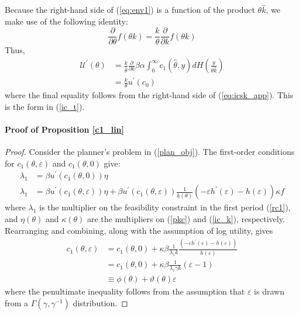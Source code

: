 \documentclass[11pt]{article}
\newcommand{\p}{\prime}
\newcommand{\inv}[1]{#1^{-1}}
\newcommand{\U}{\mathcal{U}}
\begin{document}
Because the right-hand side of (\ref{eq:env1}) is a function of the product \( \theta\hat{k} \), we make use of the following identity:
\begin{equation*}
    \frac{\partial}{\partial \theta}f(\theta k) = \frac{k}{\theta} \frac{\partial}{\partial k}f(\theta k)
\end{equation*}
Thus,
\begin{align*}
    \U^\p(\theta) &= \frac{k}{\hat{\theta}} \frac{\partial}{\partial k} \beta\alpha\int_{0}^{\infty}c_1(\hat{\theta},y)dH\left( \frac{y}{\theta \hat{k}} \right) \\
    &= \frac{k}{\theta}u^\p(c_0)
\end{align*}
where the final equality follows from the right-hand side of (\ref{eq:icsk_app}). This is the form in (\ref{ic_t}). \newpage

\paragraph{Proof of Proposition \ref{c1_lin}}
\begin{proof}
    Consider the planner's problem in (\ref{plan_obj}). The first-order conditions for \( c_1(\theta,\varepsilon) \) and \( c_1(\theta,0) \) give:
    \begin{align*}
        \lambda_{1}&=\beta u^{\prime}\left(c_{1}\left(\theta,0\right)\right)\eta \\
        \lambda_{1}&=\beta u^{\prime}\left(c_{1}\left(\theta,\varepsilon\right)\right)\eta+\beta u^{\prime}\left(c_{1}\left(\theta,\varepsilon\right)\right)\frac{1}{ k\left(\theta\right)}\left(-\varepsilon h^\p(\varepsilon)-h(\varepsilon)\right)\kappa f
    \end{align*}
    where \( \lambda_1 \) is the multiplier on the feasibility constraint in the first period (\ref{rc1}), and \( \eta(\theta) \) and \( \kappa(\theta) \) are the multipliers on (\ref{pkc}) and (\ref{ic_k}), respectively. Rearranging and combining, along with the assumption of log utility, gives
    \begin{align*}
        c_1(\theta,\varepsilon) &= c_{1}\left(\theta,0\right)+\kappa\beta\frac{1}{\lambda_{1} k}\frac{\left(-\varepsilon h^\p(\varepsilon)-h(\varepsilon)\right)}{h\left( \varepsilon \right)} \\
        &= c_{1}\left(\theta,0\right)+\kappa\beta\frac{1}{\lambda_{1}\gamma k}\left(\varepsilon-1\right) \\
        &\equiv \phi\left(\theta\right)+\vartheta\left(\theta\right)\varepsilon 
    \end{align*}
    where the penultimate inequality follows from the assumption that \( \varepsilon \) is drawn from a \( \Gamma\left( \gamma,\inv{\gamma} \right) \) distribution.
\end{proof}
\end{document}
